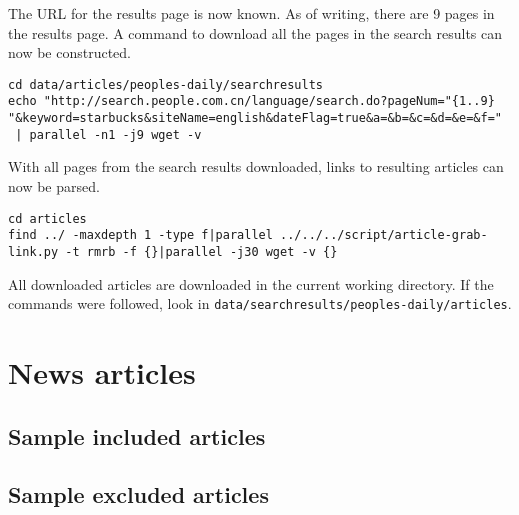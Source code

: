 The URL for the results page is now known. As of writing, there are 9 pages in
the results page. A command to download all the pages in the search results can
now be constructed.
\begin{verbatim}
cd data/articles/peoples-daily/searchresults
echo "http://search.people.com.cn/language/search.do?pageNum="{1..9}
"&keyword=starbucks&siteName=english&dateFlag=true&a=&b=&c=&d=&e=&f="
 | parallel -n1 -j9 wget -v
\end{verbatim}
With all pages from the search results downloaded, links to resulting articles
can now be parsed.
\begin{verbatim}
cd articles
find ../ -maxdepth 1 -type f|parallel ../../../script/article-grab-link.py -t rmrb -f {}|parallel -j30 wget -v {}
\end{verbatim}
All downloaded articles are downloaded in the current working directory. If the
commands were followed, look in
\texttt{data/searchresults/peoples-daily/articles}.

\chapter{News articles}\label{appdx:news-articles}

\section{Sample included articles}\label{appdx:news-articles-inc}

\section{Sample excluded articles}\label{appdx:news-articles-ninc}

